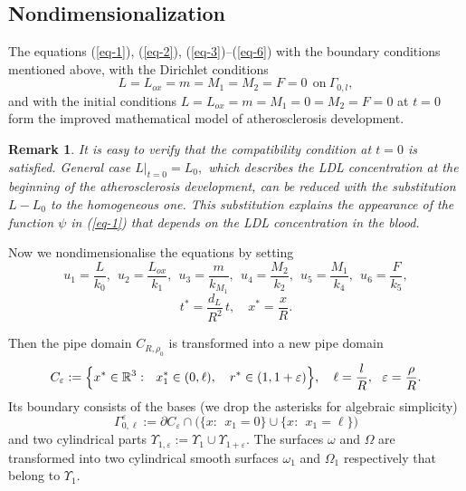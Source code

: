\documentclass[reqno]{amsart}            %
\newtheorem{remark}{Remark}[section]
\numberwithin{equation}{section}
\begin{document}
\subsection{Nondimensionalization}

The equations (\ref{eq-1}), (\ref{eq-2}), (\ref{eq-3})--(\ref{eq-6})  with the boundary conditions mentioned above,
with the Dirichlet  conditions
$$
L = L_{ox} = m = M_1 = M_2 = F = 0 \ \ \text{on} \ \Gamma_{0, l},
$$
and with the initial conditions $L= L_{ox}=  m= M_1=0 = M_2= F=0$ at $t=0$
form the improved mathematical model of atherosclerosis development.

\begin{remark}\label{rmk-1}
It is easy to verify that the compatibility condition at  $t=0$ is satisfied. General case  $L|_{t=0}=L_0,$ which describes the LDL concentration at the beginning of the atherosclerosis development, can be reduced with the substitution $L - L_0$ to the homogeneous one. This substitution explains
the appearance of the function $\psi$ in (\ref{eq-1}) that  depends on the LDL concentration in the blood.
\end{remark}

Now we nondimensionalise the equations by setting
$$
u_1= \frac{L}{k_0}, \ \ u_2= \frac{L_{ox}}{k_1},  \ \ u_3= \frac{m}{k_{M_1}}, \ \ u_4 = \frac{M_2}{k_2}, \ \ u_5= \frac{M_1}{k_4},
\ \ u_6= \frac{F}{k_5},
$$
$$
t^*= \frac{d_L}{R^2}\, t, \quad x^*= \frac{x}{R}.
$$

Then the pipe domain $C_{R, \rho_0}$ is transformed into a new pipe domain
$$
C_{\varepsilon} := \Big\{x^* \in \Bbb R^3: \ \ x^*_1 \in (0, \ell ) , \quad r^* \in (1, 1+\varepsilon) \Big\}, \quad \ell=\frac{l}{R}, \ \
\varepsilon=\frac{\rho}{R}.
$$
Its boundary consists of the bases (we drop the asterisks for algebraic simplicity)
$$
  \Gamma^\varepsilon_{0,\ell}:= \partial C_{\varepsilon} \cap \big(\{x: \ \ x_1=0\}\cup \{x: \ \ x_1=\ell\}\big)
$$
and two cylindrical parts
$
  \Upsilon_{1, \varepsilon} := \Upsilon_1 \cup \Upsilon_{1+\varepsilon}.
$
The surfaces $\omega$ and $\Omega$ are transformed into two cylindrical smooth surfaces $\omega_1$ and $\Omega_1$ respectively that belong to $\Upsilon_1.$
\end{document}
